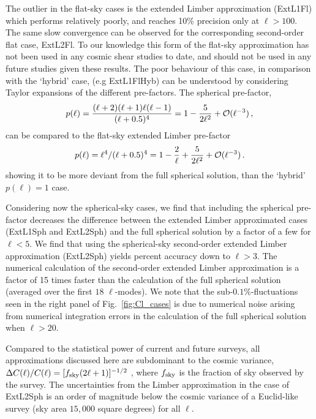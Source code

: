 \documentclass[fleqn,usenatbib]{mnras} %
\begin{document}
The outlier in the flat-sky cases is the extended Limber approximation
(ExtL1Fl) which performs relatively poorly, and reaches 10\% precision only at
$\ell > 100$. The same slow convergence can be observed for the corresponding
second-order flat case, ExtL2Fl. To our knowledge this form of the flat-sky
approximation has not been used in any cosmic shear studies to date, and should
not be used in any future studies given these results.  The poor behaviour of
this case, in comparison with the `hybrid' case, (e.g ExtL1FlHyb) can be
understood by considering Taylor expansions of the different pre-factors.  The
spherical pre-factor,
%
\begin{equation}
p(\ell) = \frac{(\ell+2)(\ell+1)\ell(\ell-1)}{(\ell + 0.5)^4} = 1-{5\over 2\ell^2} +{\cal O}(\ell^{-3}) \, ,
\end{equation}
%
can be compared to the flat-sky extended Limber pre-factor
%
\begin{equation}
p(\ell) = \ell^4 / (\ell + 0.5)^4 = 1-{2\over \ell}+{5\over 2\ell^2} +{\cal O}(\ell^{-3}) \, . 
\end{equation} 
%
showing it to be more deviant from the full spherical solution, than the
`hybrid' $p(\ell) = 1$ case. 

Considering now the spherical-sky cases, we find that including the spherical
pre-factor decreases the difference between the extended Limber approximated
cases (ExtL1Sph and ExtL2Sph) and the full spherical solution by a factor of a
few for $\ell < 5$.   We find that using the spherical-sky second-order
extended Limber approximation (ExtL2Sph) yields percent accuracy down to $\ell
> 3$.  The numerical calculation of the second-order extended Limber
approximation is a factor of 15 times faster than the calculation of the
full spherical solution (averaged over the first $18$ $\ell$-modes). We
note that the sub-$0.1\%$-fluctuations seen in the right panel of
Fig.~\ref{fig:Cl_cases} is due to numerical noise arising from numerical
integration errors in the calculation of the full spherical solution when $\ell
> 20$.

Compared to the statistical power of current and future surveys, all
approximations discussed here are subdominant to the cosmic variance, $\Delta
C(\ell) / C(\ell) = [f_{\rm sky} (2 \ell + 1)]^{-1/2}$
\citep{1992ApJ...388..272K}, where $f_{\rm sky}$ is the fraction of sky observed
by the survey. The uncertainties from the Limber approximation in the case of
ExtL2Sph is an order of magnitude below the cosmic variance of a Euclid-like
survey (sky area $15,000$ square degrees) for all $\ell$.
\end{document}
